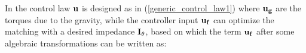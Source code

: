 %
%
%
%
%
%
%
%
%

In \cite{kugi2008passivity} the control law $\mathbf{u}$ is designed as in (\ref{generic_control_law1}) where $\mathbf{u_g}$ are the torques due to the gravity, while %
the controller input $\mathbf{u_f}$  can optimize
the matching  with a desired impedance $\mathbf{I}_{\theta}$, based on which the term $\mathbf{u_f}$ after some algebraic transformations can be written as:
%
%

